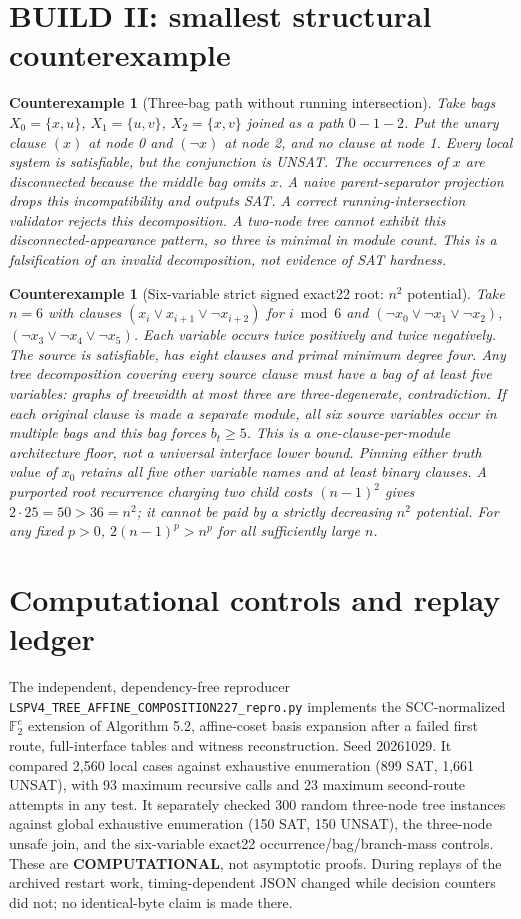 \documentclass[11pt]{article}
\newtheorem{counterexample}[theorem]{Counterexample}
\newcommand{\GF}{\mathbb F_2}
\begin{document}
\section{BUILD II: smallest structural counterexample}
\begin{counterexample}[Three-bag path without running intersection]
Take bags $X_0=\{x,u\}$, $X_1=\{u,v\}$, $X_2=\{x,v\}$ joined as a path $0-1-2$. Put the unary clause $(x)$ at node 0 and $(\neg x)$ at node 2, and no clause at node 1. Every local system is satisfiable, but the conjunction is UNSAT. The occurrences of $x$ are disconnected because the middle bag omits $x$. A naive parent-separator projection drops this incompatibility and outputs SAT. A correct running-intersection validator rejects this decomposition. A two-node tree cannot exhibit this disconnected-appearance pattern, so three is minimal in module count. This is a falsification of an \emph{invalid decomposition}, not evidence of SAT hardness.
\end{counterexample}
\begin{counterexample}[Six-variable strict signed exact22 root: $n^2$ potential]
Take $n=6$ with clauses $(x_i\lor x_{i+1}\lor\neg x_{i+2})$ for $i\bmod6$ and $(\neg x_0\lor\neg x_1\lor\neg x_2)$, $(\neg x_3\lor\neg x_4\lor\neg x_5)$. Each variable occurs twice positively and twice negatively. The source is satisfiable, has eight clauses and primal minimum degree four. Any tree decomposition covering every source clause must have a bag of at least five variables: graphs of treewidth at most three are three-degenerate, contradiction. If each original clause is made a separate module, all six source variables occur in multiple bags and this bag forces $b_t\ge5$. This is a \emph{one-clause-per-module architecture floor}, not a universal interface lower bound. Pinning either truth value of $x_0$ retains all five other variable names and at least binary clauses. A purported root recurrence charging two child costs $(n-1)^2$ gives $2\cdot25=50>36=n^2$; it cannot be paid by a strictly decreasing $n^2$ potential. For any fixed $p>0$, $2(n-1)^p>n^p$ for all sufficiently large $n$.
\end{counterexample}
\section{Computational controls and replay ledger}
The independent, dependency-free reproducer \texttt{LSPV4\_TREE\_AFFINE\_COMPOSITION227\_repro.py} implements the SCC-normalized $\GF^e$ extension of Algorithm 5.2, affine-coset basis expansion after a failed first route, full-interface tables and witness reconstruction. Seed 20261029. It compared 2,560 local cases against exhaustive enumeration (899 SAT, 1,661 UNSAT), with 93 maximum recursive calls and 23 maximum second-route attempts in any test. It separately checked 300 random three-node tree instances against global exhaustive enumeration (150 SAT, 150 UNSAT), the three-node unsafe join, and the six-variable exact22 occurrence/bag/branch-mass controls. These are \textbf{COMPUTATIONAL}, not asymptotic proofs. During replays of the archived restart work, timing-dependent JSON changed while decision counters did not; no identical-byte claim is made there.
\end{document}
